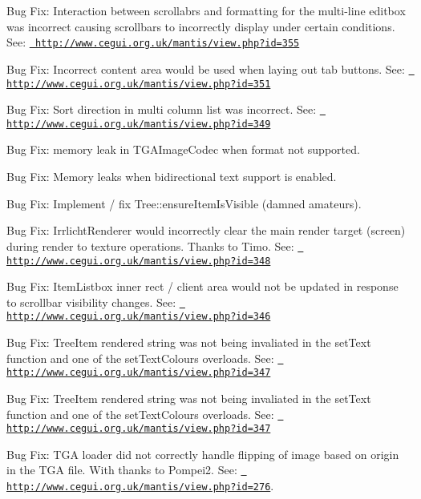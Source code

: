 \begin{DoxyItemize}
\item Bug Fix\+: Interaction between scrollabrs and formatting for the multi-\/line editbox was incorrect causing scrollbars to incorrectly display under certain conditions. See\+: \href{http://www.cegui.org.uk/mantis/view.php?id=355}{\texttt{ http\+://www.\+cegui.\+org.\+uk/mantis/view.\+php?id=355}}
\item Bug Fix\+: Incorrect content area would be used when laying out tab buttons. See\+: \href{http://www.cegui.org.uk/mantis/view.php?id=351}{\texttt{ http\+://www.\+cegui.\+org.\+uk/mantis/view.\+php?id=351}}
\item Bug Fix\+: Sort direction in multi column list was incorrect. See\+: \href{http://www.cegui.org.uk/mantis/view.php?id=349}{\texttt{ http\+://www.\+cegui.\+org.\+uk/mantis/view.\+php?id=349}}
\item Bug Fix\+: memory leak in T\+G\+A\+Image\+Codec when format not supported.
\item Bug Fix\+: Memory leaks when bidirectional text support is enabled.
\item Bug Fix\+: Implement / fix Tree\+::ensure\+Item\+Is\+Visible (damned amateurs).
\item Bug Fix\+: Irrlicht\+Renderer would incorrectly clear the main render target (screen) during render to texture operations. Thanks to Timo. See\+: \href{http://www.cegui.org.uk/mantis/view.php?id=348}{\texttt{ http\+://www.\+cegui.\+org.\+uk/mantis/view.\+php?id=348}}
\item Bug Fix\+: Item\+Listbox inner rect / client area would not be updated in response to scrollbar visibility changes. See\+: \href{http://www.cegui.org.uk/mantis/view.php?id=346}{\texttt{ http\+://www.\+cegui.\+org.\+uk/mantis/view.\+php?id=346}}
\item Bug Fix\+: Tree\+Item rendered string was not being invaliated in the set\+Text function and one of the set\+Text\+Colours overloads. See\+: \href{http://www.cegui.org.uk/mantis/view.php?id=347}{\texttt{ http\+://www.\+cegui.\+org.\+uk/mantis/view.\+php?id=347}}
\item Bug Fix\+: Tree\+Item rendered string was not being invaliated in the set\+Text function and one of the set\+Text\+Colours overloads. See\+: \href{http://www.cegui.org.uk/mantis/view.php?id=347}{\texttt{ http\+://www.\+cegui.\+org.\+uk/mantis/view.\+php?id=347}}
\item Bug Fix\+: T\+GA loader did not correctly handle flipping of image based on origin in the T\+GA file. With thanks to \textquotesingle{}Pompei2\textquotesingle{}. See\+: \href{http://www.cegui.org.uk/mantis/view.php?id=276}{\texttt{ http\+://www.\+cegui.\+org.\+uk/mantis/view.\+php?id=276}}.

\end{DoxyItemize}
